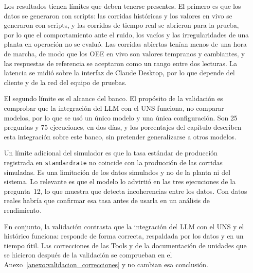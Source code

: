 Los resultados tienen límites que deben tenerse presentes. El primero es que los datos se generaron con scripts: las corridas históricas y los valores en vivo se generaron con scripts, y las corridas de tiempo real se abrieron para la prueba, por lo que el comportamiento ante el ruido, los vacíos y las irregularidades de una planta en operación no se evaluó. Las corridas abiertas tenían menos de una hora de marcha, de modo que los OEE en vivo son valores tempranos y cambiantes, y las respuestas de referencia se aceptaron como un rango entre dos lecturas. La latencia se midió sobre la interfaz de Claude Desktop, por lo que depende del cliente y de la red del equipo de pruebas.

El segundo límite es el alcance del banco. El propósito de la validación es comprobar que la integración del LLM con el UNS funciona, no comparar modelos, por lo que se usó un único modelo y una única configuración. Son 25 preguntas y 75 ejecuciones, en dos días, y los porcentajes del capítulo describen esta integración sobre este banco, sin pretender generalizarse a otros modelos.

Un límite adicional del simulador es que la tasa estándar de producción registrada en \texttt{standardrate} no coincide con la producción de las corridas simuladas. Es una limitación de los datos simulados y no de la planta ni del sistema. Lo relevante es que el modelo lo advirtió en las tres ejecuciones de la pregunta~12, lo que muestra que detecta incoherencias entre los datos. Con datos reales habría que confirmar esa tasa antes de usarla en un análisis de rendimiento.

En conjunto, la validación contrasta que la integración del LLM con el UNS y el histórico funciona: responde de forma correcta, respaldada por los datos y en un tiempo útil. Las correcciones de las Tools y de la documentación de unidades que se hicieron después de la validación se comprueban en el Anexo~\ref{anexo:validacion_correcciones} y no cambian esa conclusión.
